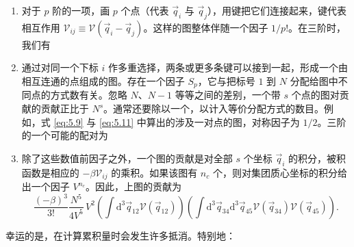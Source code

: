 \begin{enumerate}[label=(\alph*)]
\item 对于 $p$ 阶的一项，画 $p$ 个点（代表 $\vec q_i$ 与 $\vec q_j$），用键把它们连接起来，键代表相互作用 $\mathscr V_{ij}\equiv\mathscr V(\vec q_i-\vec q_j)$。这样的图整体伴随一个因子 $1/p!$。在三阶时，我们有

\begin{center}
\end{center}

\item 通过对同一个下标 $i$ 作多重选择，两条或更多条键可以接到一起，形成一个由相互连通的点组成的图。存在一个因子 $S_p$，它与把标号 $1$ 到 $N$ 分配给图中不同点的方式数有关。忽略 $N$、$N-1$ 等等之间的差别，一个带 $s$ 个点的图对贡献的贡献正比于 $N^s$。通常还要除以一个，以计入等价分配方式的数目。例如，式 \eqref{eq:5.9} 与 \eqref{eq:5.11} 中算出的涉及一对点的图，对称因子为 $1/2$。三阶的一个可能的配对为

\begin{center}
\end{center}

\item 除了这些数值前因子之外，一个图的贡献是对全部 $s$ 个坐标 $\vec q_i$ 的积分，被积函数是相应的 $-\beta\mathscr V_{ij}$ 的乘积。如果该图有 $n_c$ 个，则对集团质心坐标的积分给出一个因子 $V^{n_c}$。因此，上图的贡献为
\begin{equation*}
\frac{(-\beta)^3}{3!}\frac{N^5}{4V^5}\,V^2\left(\int\mathrm{d}^3\vec q_{12}\mathscr V(\vec q_{12})\right)\left(\int\mathrm{d}^3\vec q_{34}\mathrm{d}^3\vec q_{45}\mathscr V(\vec q_{34})\mathscr V(\vec q_{45})\right).
\end{equation*}
\end{enumerate}

幸运的是，在计算累积量时会发生许多抵消。特别地：

